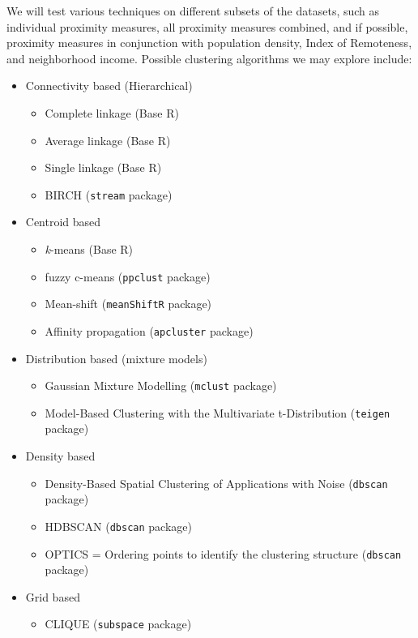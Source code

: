 \documentclass[11pt, a4paper]{article}
\begin{document}
We will test various techniques on different subsets of the datasets, such as individual proximity measures, all proximity measures combined, and if possible, proximity measures in conjunction with population density, Index of Remoteness, and neighborhood income. Possible clustering algorithms we may explore include:

\begin{itemize}
\item Connectivity based (Hierarchical)
\begin{itemize}
	\item Complete linkage (Base R)
	\item Average linkage (Base R)
	\item Single linkage (Base R)
	\item BIRCH (\texttt{stream} package)
\end{itemize}
\item Centroid based
\begin{itemize}
	\item \textit{k}-means (Base R)
	\item fuzzy c-means (\texttt{ppclust} package)
   	\item Mean-shift (\texttt{meanShiftR} package)
   	\item Affinity propagation (\texttt{apcluster} package)
\end{itemize}
\item Distribution based (mixture models)
\begin{itemize}
	\item Gaussian Mixture Modelling (\texttt{mclust} package)
   	\item Model-Based Clustering with the Multivariate t-Distribution (\texttt{teigen} package)
\end{itemize}
\item Density based
\begin{itemize}
	\item Density-Based Spatial Clustering of Applications with Noise (\texttt{dbscan} package)
	\item HDBSCAN (\texttt{dbscan} package)
	\item OPTICS = Ordering points to identify the clustering structure (\texttt{dbscan} package)
\end{itemize}
\item Grid based
\begin{itemize}
	\item CLIQUE (\texttt{subspace} package)
\end{itemize}
\end{itemize}
\end{document}
